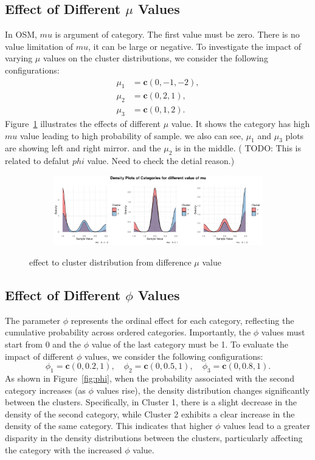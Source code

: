 \documentclass{article}
\begin{document}
\subsection{Effect of Different $\mu$ Values}
In OSM, $mu$ is argument of category. 
The first value must be zero. There is no value limitation of $mu$, it can be large or negative.
To investigate the impact of varying $\mu$ values on the cluster distributions, 
we consider the following configurations:
\[
\begin{aligned}
\mu_1 &= \mathbf{c}(0, -1, -2), \\
\mu_2 &= \mathbf{c}(0, 2, 1), \\
\mu_3 &= \mathbf{c}(0, 1, 2).
\end{aligned}
\]
Figure~\ref{fig:mu} illustrates the effects of different $\mu$ value.
It shows the category has high $mu$ value leading to high probability of sample.
we also can see, $\mu_1$ and $\mu_3$ plots are showing left and right mirror. 
and the $\mu_2$ is in the middle.
( TODO: This is related to defalut $phi$ value. 
Need to check the detial reason.)

\begin{figure}[htbp!]
  \centering
  \begin{subfigure}{1.0\textwidth}
      \centering
      \includegraphics[width=\textwidth]{images/para_sim/mu.png}
  \end{subfigure}
  \caption{effect to cluster distribution from difference $\mu$ value}
  \label{fig:mu}
\end{figure}

\clearpage

\subsection{Effect of Different $\phi$ Values}
The parameter $\phi$ represents the ordinal effect for each category, reflecting the cumulative probability across ordered categories. 
Importantly, the $\phi$ values must start from 0 and the $\phi$ value of the last category must be 1. 
To evaluate the impact of different $\phi$ values, we consider the following configurations:
\[
\phi_1 = \mathbf{c}(0, 0.2, 1), \quad \phi_2 = \mathbf{c}(0, 0.5, 1), \quad \phi_3 = \mathbf{c}(0, 0.8, 1).
\]
As shown in Figure~\ref{fig:phi}, 
when the probability associated with the second category increases (as $\phi$ values rise), 
the density distribution changes significantly between the clusters. 
Specifically, in Cluster 1, there is a slight decrease in the density of the second category, 
while Cluster 2 exhibits a clear increase in the density of the same category. 
This indicates that higher $\phi$ values lead to a greater disparity 
in the density distributions between the clusters, 
particularly affecting the category with the increased $\phi$ value.
\end{document}
